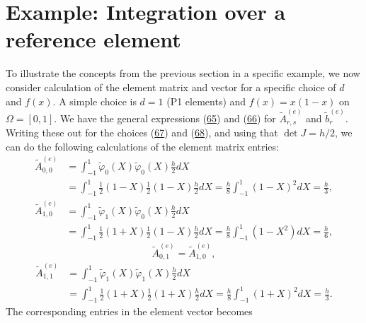 \documentclass[../main.tex]{subfiles}
\begin{document}
\section[Example: Integration over a reference element]{Example: Integration over a reference element}
\label{sec:sec_3_9}
\noindent To illustrate the concepts from the previous section in a specific example, we now consider calculation of the element matrix and vector for a specific choice of $d$ and $f(x)$. A simple choice is $d=1$ (P1 elements) and $f(x)=x(1-x)$ on $\Omega=[0,1]$. We have the general expressions (\hyperref[eqa65]{65}) and (\hyperref[eqa66]{66}) for $\tilde{A}_{r, s}^{(e)}$ and $\tilde{b}_{r}^{(e)}$. Writing these out for the choices (\hyperref[eqa67]{67}) and (\hyperref[eqa68]{68}), and using that $\operatorname{det} J=h / 2$, we can do the following calculations of the element matrix entries:
\begin{equation}\label{eqa73}
	\begin{aligned}
		\tilde{A}_{0,0}^{(e)} &=\int_{-1}^{1} \tilde{\varphi}_{0}(X) \tilde{\varphi}_{0}(X) \frac{h}{2} d X \\
		&=\int_{-1}^{1} \frac{1}{2}(1-X) \frac{1}{2}(1-X) \frac{h}{2} d X=\frac{h}{8} \int_{-1}^{1}(1-X)^{2} d X=\frac{h}{3},
	\end{aligned}
\end{equation}
\begin{equation}\label{eqa74}
	\begin{aligned}
		\tilde{A}_{1,0}^{(e)} &=\int_{-1}^{1} \tilde{\varphi}_{1}(X) \tilde{\varphi}_{0}(X) \frac{h}{2} d X \\
		&=\int_{-1}^{1} \frac{1}{2}(1+X) \frac{1}{2}(1-X) \frac{h}{2} d X=\frac{h}{8} \int_{-1}^{1}\left(1-X^{2}\right) d X=\frac{h}{6},
	\end{aligned}
\end{equation}
\begin{equation}\label{eqa75}
	\tilde{A}_{0,1}^{(e)} =\tilde{A}_{1,0}^{(e)},
\end{equation}
\begin{equation}\label{eqa76}
	\begin{aligned}
		\tilde{A}_{1,1}^{(e)} &=\int_{-1}^{1} \tilde{\varphi}_{1}(X) \tilde{\varphi}_{1}(X) \frac{h}{2} d X \\
		&=\int_{-1}^{1} \frac{1}{2}(1+X) \frac{1}{2}(1+X) \frac{h}{2} d X=\frac{h}{8} \int_{-1}^{1}(1+X)^{2} d X=\frac{h}{3}.
	\end{aligned}
\end{equation}
The corresponding entries in the element vector becomes
\end{document}
